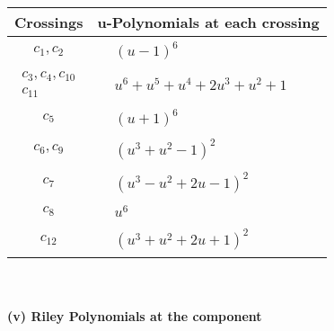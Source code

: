 \documentclass[1p]{elsarticle_modified}
\theoremstyle{definition}
\begin{document}
\begin{tabular}{m{50pt}|m{274pt}}
Crossings & \hspace{64pt}u-Polynomials at each crossing \\
\hline $$\begin{aligned}c_{1},c_{2}\end{aligned}$$&$\begin{aligned}
&(u-1)^6
\end{aligned}$\\
\hline $$\begin{aligned}c_{3},c_{4},c_{10}\\c_{11}\end{aligned}$$&$\begin{aligned}
&u^6+u^5+u^4+2 u^3+u^2+1
\end{aligned}$\\
\hline $$\begin{aligned}c_{5}\end{aligned}$$&$\begin{aligned}
&(u+1)^6
\end{aligned}$\\
\hline $$\begin{aligned}c_{6},c_{9}\end{aligned}$$&$\begin{aligned}
&(u^3+u^2-1)^2
\end{aligned}$\\
\hline $$\begin{aligned}c_{7}\end{aligned}$$&$\begin{aligned}
&(u^3- u^2+2 u-1)^2
\end{aligned}$\\
\hline $$\begin{aligned}c_{8}\end{aligned}$$&$\begin{aligned}
&u^6
\end{aligned}$\\
\hline $$\begin{aligned}c_{12}\end{aligned}$$&$\begin{aligned}
&(u^3+u^2+2 u+1)^2
\end{aligned}$\\
\hline
\end{tabular}\\~\\
\newpage\renewcommand{\arraystretch}{1}
\flushleft \textbf{(v) Riley Polynomials at the component}\newline \\
\end{document}
